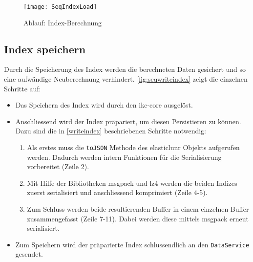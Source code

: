     \begin{figure}[H]
    \centering
    \texttt{[image: SeqIndexLoad]}
    \caption{Ablauf: Index-Berechnung}
    \label{fig:seqindexload}
    \end{figure}



    
    
\subsection{Index speichern}


Durch die Speicherung des Index werden die berechneten Daten gesichert und so eine aufwändige Neuberechnung verhindert. \autoref{fig:seqwriteindex} zeigt die einzelnen Schritte auf:
\begin{itemize}
    \item Das Speichern des Index wird durch den \gls{ikc-core} ausgelöst.
    \item Anschliessend wird der Index präpariert, um diesen Persistieren zu können. Dazu sind die in \autoref{writeindex} beschriebenen Schritte notwendig:
    \begin{enumerate}
        \item Als erstes muss die \texttt{toJSON} Methode des \gls{elasticlunr} Objekts aufgerufen werden. Dadurch werden intern Funktionen für die Serialisierung vorbereitet (Zeile 2).
        \item Mit Hilfe der Bibliotheken \gls{msgpack} und \gls{lz4} werden die beiden Indizes zuerst serialisiert und anschliessend komprimiert (Zeile 4-5).
        \item Zum Schluss werden beide resultierenden Buffer in einem einzelnen Buffer zusammengefasst (Zeile 7-11). Dabei werden diese mittels \gls{msgpack} erneut serialisiert.
    \end{enumerate}
    \item Zum Speichern wird der präparierte Index schlussendlich an den \texttt{DataService} gesendet. 
\end{itemize}


